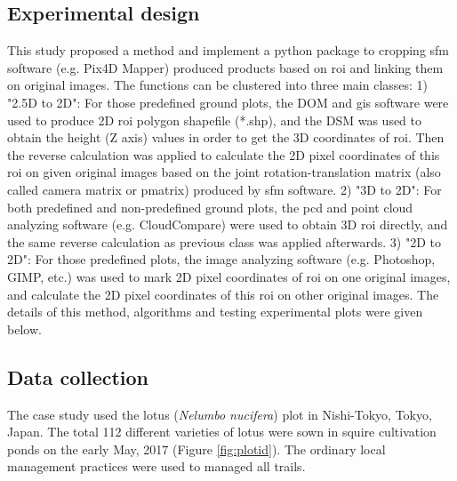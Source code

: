 \documentclass[sensors,article,submit,moreauthors, xelatex]{Definitions/mdpi}
\begin{document}
\subsection{Experimental design}
This study proposed a method and implement a python package to cropping \acrshort*{sfm} software (e.g. Pix4D Mapper) produced products based on \acrfull*{roi} and linking them on original images. The functions can be clustered into three main classes: 1) "2.5D to 2D": For those predefined ground plots, the DOM and \acrfull*{gis} software were used to produce 2D \acrshort*{roi} polygon shapefile (*.shp), and the DSM was used to obtain the height (Z axis) values in order to get the 3D coordinates of \acrshort*{roi}. Then the reverse calculation was applied to calculate the 2D pixel coordinates of this \acrshort*{roi} on given original images based on the joint rotation-translation matrix (also called camera matrix or pmatrix) produced by \acrshort*{sfm} software. 2) "3D to 2D": For both predefined and non-predefined ground plots, the \acrfull*{pcd} and point cloud analyzing software (e.g. CloudCompare) were used to obtain 3D \acrshort*{roi} directly, and the same reverse calculation as previous class was applied afterwards. 3) "2D to 2D": For those predefined plots, the image analyzing software (e.g. Photoshop, GIMP, etc.) was used to mark 2D pixel coordinates of \acrshort*{roi} on one original images, and calculate the 2D pixel coordinates of this \acrshort*{roi} on other original images. The details of this method, algorithms and testing experimental plots were given below.

\subsection{Data collection}

The case study used the lotus (\textit{Nelumbo nucifera}) plot in Nishi-Tokyo, Tokyo, Japan. The total 112 different varieties of lotus were sown in squire cultivation ponds on the early May, 2017 (Figure \ref{fig:plotid}). The ordinary local management practices were used to managed all trails.
\end{document}
